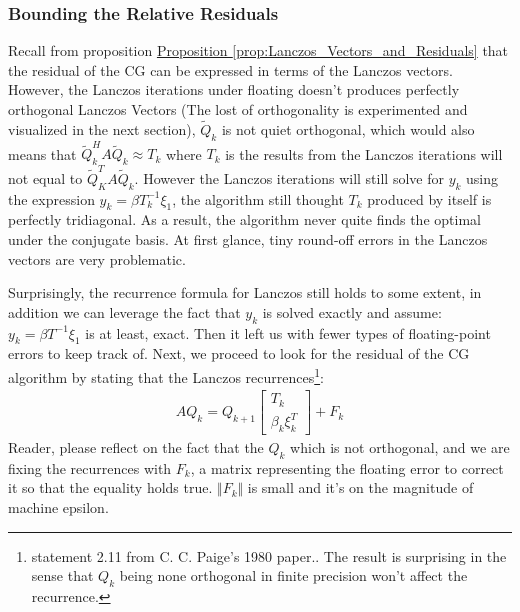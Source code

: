\documentclass[]{article}
\theoremstyle{definition}
\begin{document}
        \subsubsection{Bounding the Relative Residuals}
            Recall from proposition \hyperref[prop:Lanczos_Vectors_and_Residuals]{Proposition \ref*{prop:Lanczos_Vectors_and_Residuals}} that the residual of the CG can be expressed in terms of the Lanczos vectors. However, the Lanczos iterations under floating doesn't produces perfectly orthogonal Lanczos Vectors (The lost of orthogonality is experimented and visualized in the next section), $\tilde{Q}_k$ is not quiet orthogonal, which would also means that $\tilde{Q}_k^HA\tilde{Q}_k\approx T_k$ where $T_k$ is the results from the Lanczos iterations will not equal to $\tilde{Q}^T_KA\tilde{Q}_k$. However the Lanczos iterations will still solve for $y_k$ using the expression $y_k = \beta T^{-1}_k\xi_1$, the algorithm still thought $T_k$ produced by itself is perfectly tridiagonal. As a result, the algorithm never quite finds the optimal under the conjugate basis. At first glance, tiny round-off errors in the Lanczos vectors are very problematic. 
            \par
            Surprisingly, the recurrence formula for Lanczos still holds to some extent, in addition we can leverage the fact that $y_k$ is solved exactly and assume: $y_k = \beta T^{-1}\xi_1$ is at least, exact. Then it left us with fewer types of floating-point errors to keep track of. Next, we proceed to look for the residual of the CG algorithm by stating that the Lanczos recurrences\footnote{statement 2.11 from C. C. Paige's 1980 paper.\cite{paper:paige1980}. The result is surprising in the sense that $Q_k$ being none orthogonal in finite precision won't affect the recurrence.}: 
            \begin{align}
                AQ_k = Q_{k + 1} \begin{bmatrix}
                    T_k
                    \\
                    \beta_k \xi_k^T
                \end{bmatrix} + F_k
            \end{align}
            Reader, please reflect on the fact that the $Q_k$ which is not orthogonal, and we are fixing the recurrences with $F_k$, a matrix representing the floating error to correct it so that the equality holds true. $\Vert F_k\Vert$ is small and it's on the magnitude of machine epsilon. 
\end{document}
